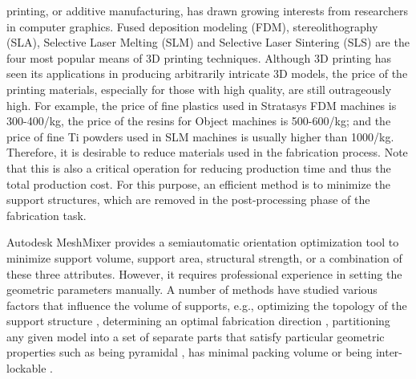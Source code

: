 


 printing, or additive manufacturing, has drawn growing interests from researchers in computer graphics. Fused deposition modeling (FDM), stereolithography (SLA), Selective Laser Melting (SLM) and Selective Laser Sintering (SLS) are the four most popular means of 3D printing techniques. Although 3D printing has seen its applications in producing arbitrarily intricate 3D models, the price of the printing materials, especially for those with high quality, are still outrageously high. {\color{blue} For example, the price of fine plastics used in Stratasys FDM machines is 300-400\textdollar /kg, the price of the resins for Object machines is 500-600\textdollar /kg; and the price of fine Ti powders used in SLM machines is usually higher than 1000\textdollar /kg.} Therefore, it is desirable to reduce materials used in the fabrication process. Note that this is also a critical operation for reducing production time and thus the total production cost. For this purpose, an efficient method is to minimize the support structures, which are removed in the post-processing phase of the fabrication task.

Autodesk MeshMixer provides a semiautomatic orientation optimization tool to minimize support volume, support area, structural strength, or a combination of these three attributes. However, it requires professional experience in setting the geometric parameters manually. A number of methods have studied various factors that influence the volume of supports, e.g., optimizing the topology of the support structure \cite{DumasHL14,VanekGB14}, determining an optimal fabrication direction \cite{Zhang:2015,HildebrandBA13,padhye2011multi}, partitioning any given model into a set of separate parts that satisfy particular geometric properties such as being pyramidal \cite{Hu_siga14}, has minimal packing volume \cite{VanekGBMCSM14} or being inter-lockable \cite{SongFLF15}.




